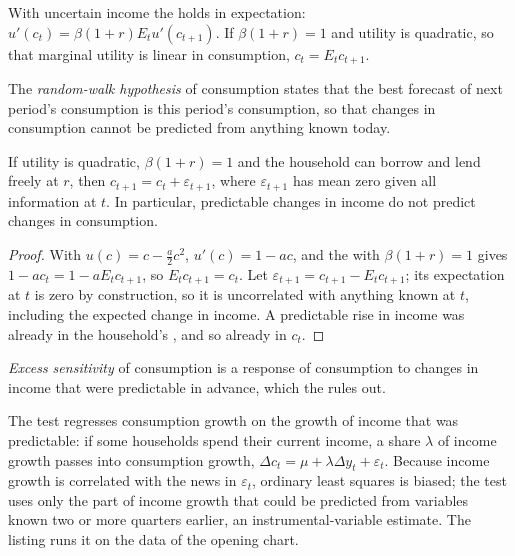 With uncertain income the  holds in expectation: $u'(c_t) = \beta(1 + r)E_t u'(c_{t+1})$. If $\beta(1 + r) = 1$ and utility is quadratic, so
that marginal utility is linear in consumption, $c_t = E_t c_{t+1}$.

\begin{definition}\label{def:b2:consumption:random-walk-hypothesis}
The \emph{random-walk hypothesis} of consumption states that the best forecast of next
period's consumption is this period's consumption, so that changes in consumption cannot be predicted from anything
known today.
\end{definition}

\begin{proposition}\label{prop:b2:consumption:random-walk}
If utility is quadratic, $\beta(1 + r) = 1$ and the household can borrow and lend freely at $r$, then $c_{t+1} = c_t + \varepsilon_{t+1}$, where $\varepsilon_{t+1}$ has mean zero given
all information at $t$. In particular, predictable changes in income do not predict changes in consumption.
\end{proposition}

\begin{proof}
With $u(c) = c - \tfrac{a}{2}c^2$, $u'(c) = 1 - ac$, and the  with $\beta(1 + r) = 1$ gives $1 - ac_t = 1 - aE_t c_{t+1}$, so $E_t c_{t+1} = c_t$. Let $\varepsilon_{t+1} = c_{t+1} - E_t c_{t+1}$;
its expectation at $t$ is zero by construction, so it is uncorrelated with anything known at $t$, including the expected change in
income. A predictable rise in income was already in the household's , and so already in $c_t$.
\end{proof}

\begin{definition}\label{def:b2:consumption:excess-sensitivity}
\emph{Excess sensitivity} of consumption is a response of consumption to changes in income
that were predictable in advance, which the  rules out.
\end{definition}

The test regresses consumption growth on the growth of income that was predictable: if some households spend their
current income, a share $\lambda$ of income growth passes into consumption growth, $\Delta c_t = \mu + \lambda\Delta y_t + \varepsilon_t$. Because income growth is
correlated with the news in $\varepsilon_t$, ordinary least squares is biased; the test uses only the part of income growth that could
be predicted from variables known two or more quarters earlier, an instrumental-variable estimate. The listing runs it
on the data of the opening chart.

